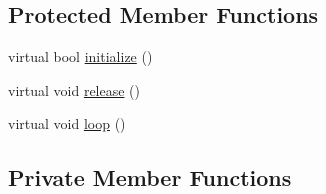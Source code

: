 \subsection*{Protected Member Functions}
\begin{DoxyCompactItemize}
\item 
virtual bool \hyperlink{classSteppingDemoClient_a08dce195eece162eed175ac9487667c2}{initialize} ()
\item 
virtual void \hyperlink{classSteppingDemoClient_aafcb227c0d7ce24823957e2331caa88b}{release} ()
\item 
virtual void \hyperlink{classSteppingDemoClient_a37dba4764b5849cf33c395cd0d4b0eb5}{loop} ()
\end{DoxyCompactItemize}
\subsection*{Private Member Functions}
